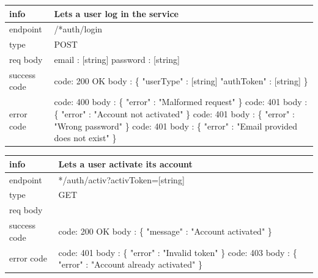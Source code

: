 \documentclass[titlepage]{article}
\begin{document}
	\vspace{\baselineskip}
	
	\begin{tabularx}{\textwidth}{lX} \hline
		info & Lets a user log in the service \\ \hline
		endpoint & /*auth/login \\ \hline
		type & POST \\ \hline
		req body & 
		email : [string] \newline
		password : [string] \\ \hline
		success code &
		code: 200 OK \newline
		body : \{ \newline
		"userType" : [string] \newline
		"authToken" : [string] \newline
		\} \\ \hline
		error code &
		code: 400 \newline
		body : \{ "error" : "Malformed request" \} \newline \newline
		code: 401 \newline
		body : \{ "error" : "Account not activated" \} \newline \newline
		code: 401 \newline
		body : \{ "error" : "Wrong password" \}
		\newline \newline
		code: 401 \newline
		body : \{ "error" : "Email provided does not exist" \} \\ \hline
	\end{tabularx}
	
	\vspace{\baselineskip}
	
	\begin{tabularx}{\textwidth}{lX} \hline
		info & Lets a user activate its account \\ \hline
		endpoint & */auth/activ?activToken=[string] \\ \hline
		type & GET \\ \hline
		req body & \\ \hline
		success code &
		code: 200 OK \newline \newline 
		body : \{ \newline
		"message" : "Account activated" \newline
		\} \\ \hline
		error code &
		code: 401 \newline
		body : \{ "error" : "Invalid token" \} \newline \newline
		code: 403 \newline
		body : \{ "error" : "Account already activated" \} \\ \hline
	\end{tabularx}
	
\end{document}
